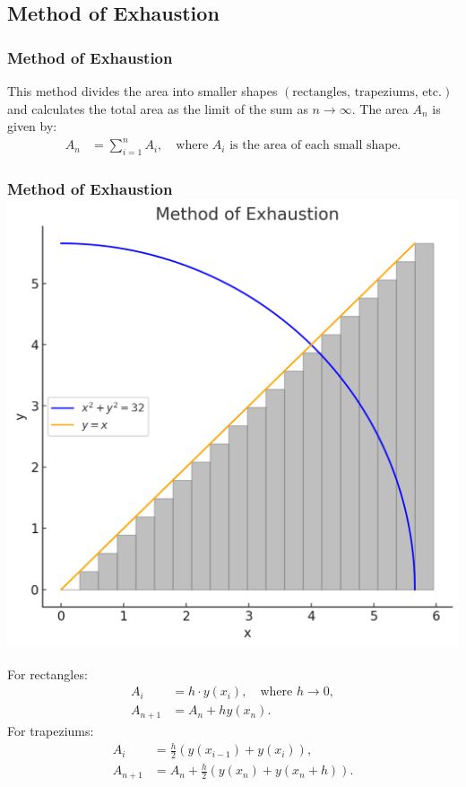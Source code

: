 \documentclass{beamer}
\theoremstyle{remark}
\numberwithin{equation}{section}
\begin{document}
\subsection{Method of Exhaustion}
\begin{frame}
\frametitle{Method of Exhaustion}
This method divides the area into smaller shapes \((\text{rectangles, trapeziums, etc.})\) and calculates the total area as the limit of the sum as \(n \to \infty\). The area \(A_n\) is given by:
\begin{align}
    A_n &= \sum_{i=1}^n A_i, \quad \text{where } A_i \text{ is the area of each small shape.}
\end{align}
\frametitle{\hspace{0.5em} Method of Exhaustion \hfill \includegraphics[scale=0.1]{figs/6.png}}
\end{frame}
\begin{frame}
For rectangles:
\begin{align}
    A_i &= h \cdot y(x_i), \quad \text{where } h \to 0,\\
    A_{n+1} &= A_n + h y(x_n).
\end{align}
For trapeziums:
\begin{align}
    A_i &= \frac{h}{2}\left(y(x_{i-1}) + y(x_i)\right),\\
    A_{n+1} &= A_n + \frac{h}{2}\left(y(x_n) + y(x_n + h)\right).
\end{align}
\end{frame}
\end{document}
